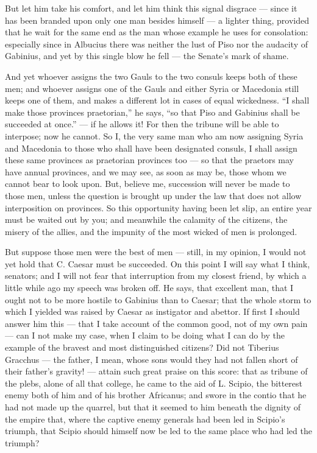  But let him take his comfort, and let him think this signal disgrace --- since it has been branded upon only one man besides himself --- a lighter thing, provided that he wait for the same end as the man whose example he uses for consolation: especially since in Albucius there was neither the lust of Piso nor the audacity of Gabinius, and yet by this single blow he fell --- the Senate's mark of shame.

 And yet whoever assigns the two Gauls to the two consuls keeps both of these men; and whoever assigns one of the Gauls and either Syria or Macedonia still keeps one of them, and makes a different lot in cases of equal wickedness. ``I shall make those provinces praetorian,'' he says, ``so that Piso and Gabinius shall be succeeded at once.'' --- if he allows it! For then the tribune will be able to interpose; now he cannot. So I, the very same man who am now assigning Syria and Macedonia to those who shall have been designated consuls, I shall assign these same provinces as praetorian provinces too --- so that the praetors may have annual provinces, and we may see, as soon as may be, those whom we cannot bear to look upon. But, believe me, succession will never be made to those men, unless the question is brought up under the law that does not allow interposition on provinces. So this opportunity having been let slip, an entire year must be waited out by you; and meanwhile the calamity of the citizens, the misery of the allies, and the impunity of the most wicked of men is prolonged.

 But suppose those men were the best of men --- still, in my opinion, I would not yet hold that C. Caesar must be succeeded. On this point I will say what I think, senators; and I will not fear that interruption from my closest friend, by which a little while ago my speech was broken off. He says, that excellent man, that I ought not to be more hostile to Gabinius than to Caesar; that the whole storm to which I yielded was raised by Caesar as instigator and abettor. If first I should answer him this --- that I take account of the common good, not of my own pain --- can I not make my case, when I claim to be doing what I can do by the example of the bravest and most distinguished citizens? Did not Tiberius Gracchus --- the father, I mean, whose sons would they had not fallen short of their father's gravity! --- attain such great praise on this score: that as tribune of the plebs, alone of all that college, he came to the aid of L. Scipio, the bitterest enemy both of him and of his brother Africanus; and swore in the contio that he had not made up the quarrel, but that it seemed to him beneath the dignity of the empire that, where the captive enemy generals had been led in Scipio's triumph, that Scipio should himself now be led to the same place who had led the triumph?

